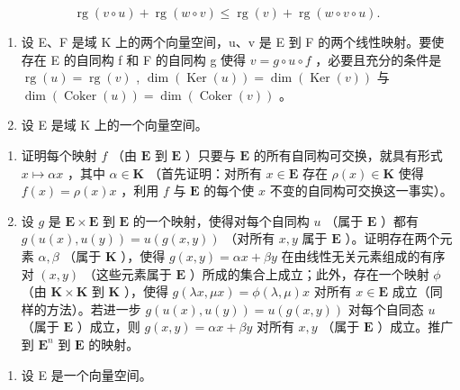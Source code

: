 \[
\operatorname{rg} (v \circ u) + \operatorname{rg} (w \circ v) \leqslant \operatorname{rg} (v) + \operatorname{rg} (w \circ v \circ u).
\]

\begin{enumerate}
\def\labelenumi{\arabic{enumi}.}
\setcounter{enumi}{17}
\item
  设 E、F 是域 K 上的两个向量空间，u、v 是 E 到 F 的两个线性映射。要使存在 E 的自同构 f 和 F 的自同构 g 使得 \(v = g \circ u \circ f\) ，必要且充分的条件是 \(\operatorname{rg}(u) = \operatorname{rg}(v)\) , \(\dim(\operatorname{Ker}(u)) = \dim(\operatorname{Ker}(v))\) 与 \(\dim(\operatorname{Coker}(u)) = \dim(\operatorname{Coker}(v))\) 。
\item
  设 E 是域 K 上的一个向量空间。
\end{enumerate}

\begin{enumerate}
\def\labelenumi{(\alph{enumi})}
\item
  证明每个映射 \(f\) （由 \(\mathbf{E}\) 到 \(\mathbf{E}\) ）只要与 \(\mathbf{E}\) 的所有自同构可交换，就具有形式 \(x \mapsto \alpha x\) ，其中 \(\alpha \in \mathbf{K}\) （首先证明：对所有 \(x \in \mathbf{E}\) 存在 \(\rho(x) \in \mathbf{K}\) 使得 \(f(x) = \rho(x)x\) ，利用 \(f\) 与 \(\mathbf{E}\) 的每个使 \(x\) 不变的自同构可交换这一事实）。
\item
  设 \(g\) 是 \(\mathbf{E} \times \mathbf{E}\) 到 \(\mathbf{E}\) 的一个映射，使得对每个自同构 \(u\) （属于 \(\mathbf{E}\) ）都有 \(g(u(x), u(y)) = u(g(x, y))\) （对所有 \(x, y\) 属于 \(\mathbf{E}\) ）。证明存在两个元素 \(\alpha, \beta\) （属于 \(\mathbf{K}\) ），使得 \(g(x, y) = \alpha x + \beta y\) 在由线性无关元素组成的有序对 \((x, y)\) （这些元素属于 \(\mathbf{E}\) ）所成的集合上成立；此外，存在一个映射 \(\phi\) （由 \(\mathbf{K} \times \mathbf{K}\) 到 \(\mathbf{K}\) ），使得 \(g(\lambda x, \mu x) = \phi(\lambda, \mu)x\) 对所有 \(x \in \mathbf{E}\) 成立（同样的方法）。若进一步 \(g(u(x), u(y)) = u(g(x, y))\) 对每个自同态 \(u\) （属于 \(\mathbf{E}\) ）成立，则 \(g(x, y) = \alpha x + \beta y\) 对所有 \(x, y\) （属于 \(\mathbf{E}\) ）成立。推广到 \(\mathbf{E}^n\) 到 \(\mathbf{E}\) 的映射。
\end{enumerate}

\begin{enumerate}
\def\labelenumi{\arabic{enumi}.}
\setcounter{enumi}{19}
\tightlist
\item
  设 E 是一个向量空间。
\end{enumerate}

